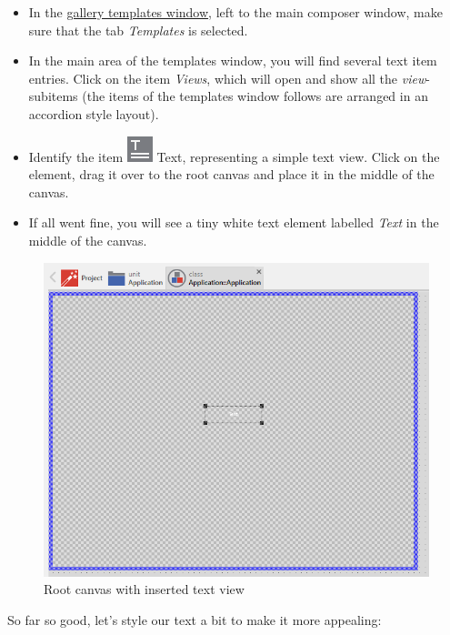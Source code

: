 \documentclass[
  a4paper,
,tablecaptionabove
]{scrbook}
\begin{document}
\begin{itemize}
\item
  In the
  \href{https://doc.embedded-wizard.de/gallery-templates-window}{gallery
  templates window}, left to the main composer window, make sure that
  the tab \emph{Templates} is selected.
\item
  In the main area of the templates window, you will find several text
  item entries. Click on the item \emph{Views}, which will open and show
  all the \emph{view}-subitems (the items of the templates window
  follows are arranged in an accordion style layout).
\item
  Identify the item
  \includegraphics{./../asciidoc/modules/ROOT/assets/images/icons/TextViewIcon.png}
  Text, representing a simple text view. Click on the element, drag it
  over to the root canvas and place it in the middle of the canvas.
\item
  If all went fine, you will see a tiny white text element labelled
  \emph{Text} in the middle of the canvas.
\end{itemize}

\begin{figure}
\centering
\includegraphics{./../asciidoc/modules/ROOT/assets/images/helloworld/RootCanvasTextView.png}
\caption{Root canvas with inserted text view}
\end{figure}

So far so good, let's style our text a bit to make it more appealing:
\end{document}
